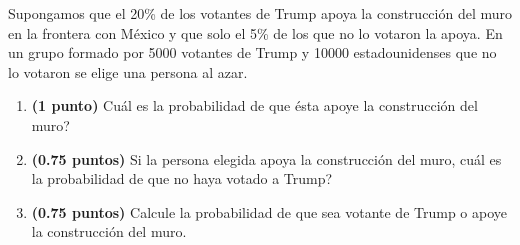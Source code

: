 
Supongamos que el 20\% de los votantes de Trump apoya la construcción del muro en la frontera con México y que solo el 5\% de los que no lo votaron la apoya. En un grupo formado por 5000 votantes de Trump y 10000 estadounidenses que no lo votaron se elige una persona al azar.
\begin{enumerate}[label=\alph*)]
\item \textbf{(1 punto)} \textquestiondown{}Cuál es la probabilidad de que ésta apoye la construcción del muro?
\item \textbf{(0.75 puntos)} Si la persona elegida apoya la construcción del muro, \textquestiondown{}cuál es la probabilidad de que no haya votado a Trump?
\item \textbf{(0.75 puntos)} Calcule la probabilidad de que sea votante de Trump o apoye la construcción del muro.
\end{enumerate}

